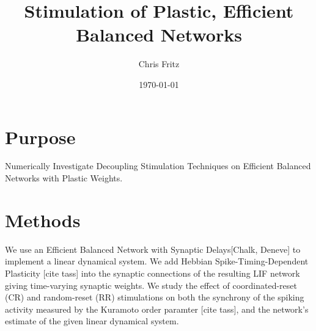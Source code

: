 \documentclass{article}
\title{Stimulation of Plastic, Efficient Balanced Networks}
\author{Chris Fritz}
\date{\today}
\numberwithin{equation}{section}
\begin{document}
\maketitle


\section{Purpose} Numerically Investigate Decoupling Stimulation Techniques on Efficient Balanced Networks with Plastic Weights. 

\section{Methods}


We use an Efficient Balanced Network with Synaptic Delays[Chalk, Deneve] to implement a linear dynamical system. We add Hebbian Spike-Timing-Dependent Plasticity [cite tass] into the synaptic connections of the resulting LIF network giving time-varying synaptic weights. We study the effect of coordinated-reset (CR) and random-reset (RR) stimulations on both the synchrony of the spiking activity measured by the Kuramoto order paramter [cite tass],  and the network's estimate of the given linear dynamical system. 
\end{document}
